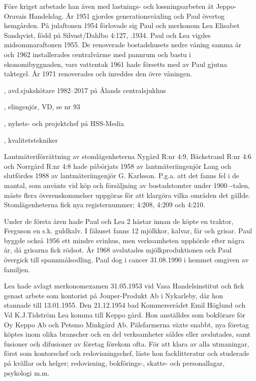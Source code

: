 Före kriget arbetade han även med lastnings- och lossningsarbeten åt Jeppo-Oravais Handelslag. År 1951 gjordes generationsväxling och Paul övertog hemgården. På julaftonen 1954 förlovade sig Paul och merkonom Lea Elisabet Sandqvist, född på Silvast/Dahlbo 4:127, .1934. Paul och Lea vigdes midsommaraftonen 1955. De renoverade bostadshusets nedre våning samma år och 1962 installerades centralvärme med pannrum och bastu i ekonomibyggnaden, vars vattentak 1961 hade försetts med av Paul gjutna taktegel. År 1971 renoverades och inreddes den övre våningen.
\begin{jhchildren}
  \item {},	avd.sjukskötare 1982--2017 på Ålands centralsjukhus
  \item {}, elingenjör, VD, se nr 93
  \item {}, nyhets- och projektchef på HSS-Media
  \item {}, kvalitetstekniker
\end{jhchildren}
Lantmäteriförrättning av stomlägenheterna Nygård R:nr 4:9,  Bäckstrand R:nr 4:6 och Norrgård R:nr 4:8 hade påbörjats 1958 av lantmäteriingenjör Lang och slutfördes 1988 av lantmäteriingenjör G. Karlsson. P.g.a. att det fanns fel i de mantal, som använts vid köp och försäljning av bostadstomter under 1900---talen, måste flera överenskommelser uppgöras för att klargöra vilka områden det gällde. Stomlägenheterna fick nya registernummer; 4:208, 4:209 och 4:210.

Under de första åren hade Paul och Lea 2 hästar innan de köpte en traktor, Ferguson en s.k. guldkalv. I fähuset fanns 12 mjölkkor, kalvar, får och grisar. Paul byggde också 1956 ett mindre svinhus, men verksamheten upphörde efter några år, då grisarna fick rödsot. År 1968 avslutades mjölkproduktionen och Paul övergick till spannmålsodling. Paul dog i cancer 31.08.1990 i hemmet omgiven av familjen.

Lea hade avlagt merkonomexamen 31.05.1953 vid Vasa Handelsinstitut och fick genast arbete som kontorist på Jouper-Produkt Ab i Nykarleby, där hon stannade till 13.01.1955. Den 21.12.1954 bad Kommerserådet Emil Höglund och Vd K.J.Tidström Lea komma till Keppo gård. Hon anställdes som bokförare för Oy Keppo Ab och Petsmo Minkgård Ab. Pälsfarmerna växte snabbt, nya företag köptes inom olika branscher och en del verksamheter såldes eller avslutades, samt fusioner och difusioner av företag förekom ofta. För att klara av alla utmaningar, först som kontorschef och redovisningschef, läste hon facklitteratur och studerade på kvällar och helger; redovisning, bokförings-, skatte- och personallagar, psykologi m.m.

